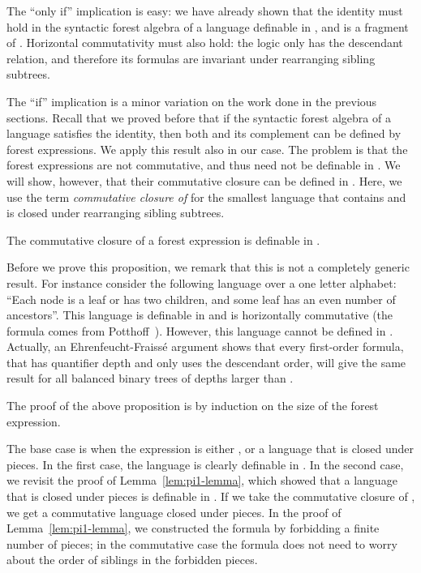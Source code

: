 \documentclass{LMCS}
\begin{document}
The ``only if'' implication is easy: we have already shown that the 
identity must hold in the syntactic forest algebra of a language definable in
\Dtwol, and \Dtwo is a fragment of \Dtwol. Horizontal commutativity must
also hold: the logic only has the descendant relation, and therefore its
formulas are invariant under rearranging sibling subtrees.

The ``if'' implication is a minor variation on the work done in the
previous sections.  Recall that we proved before that if the syntactic
forest algebra of a language  satisfies the  identity,
then both  and its complement can be defined by  forest
expressions. We apply this result also in our case. The problem is
that the  forest expressions are not commutative, and thus
need not be definable in \Stwo.  We will show, however, that their
commutative closure can be defined in \Stwo. Here, we use the term
\emph{commutative closure of } for the smallest language that
contains  and is closed under rearranging sibling subtrees.


\begin{prop}
  The commutative closure of a  forest expression is
  definable in \Stwo.
\end{prop}
Before we prove this proposition, we remark that this is not a
completely generic result. For instance consider the following language over a one letter alphabet: ``Each node is a
leaf or has two children, and some leaf has an even number of
ancestors''. This language is definable in  and is horizontally
commutative (the formula comes from Potthoff~\cite{potthoff}). However, this language cannot be defined in . Actually,   an Ehrenfeucht-Fraiss\'e argument shows that every   first-order formula, that has  quantifier depth   and only uses the
descendant order, will give the same result for all balanced binary trees of depths larger than .


The proof of the above proposition is by induction on the size of the
 forest expression. 

The base case is when the   expression is either , or a language that is closed under pieces. In the first
case, the language is clearly definable in \Stwo. In the second case,
we revisit the proof of Lemma~\ref{lem:pi1-lemma}, which showed that a
language  that is closed under pieces is definable in . If
we take the commutative closure of , we get a commutative language closed
under pieces. In the proof of Lemma~\ref{lem:pi1-lemma}, we
constructed the  formula by  forbidding a finite number of
pieces; in the commutative case the formula does not need to worry
about the order of siblings in the forbidden pieces.
\end{document}
